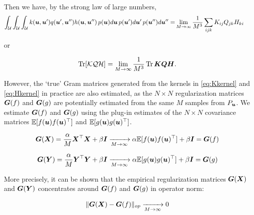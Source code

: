 %
%

Then we have, by the strong law of large numbers,
%
\begin{align*}
     \int_{\mathcal{U}} \int_{\mathcal{U}} \int_{\mathcal{U}} k(\boldsymbol{u}, \boldsymbol{u}') q(\boldsymbol{u}', \boldsymbol{u}'') h(\boldsymbol{u}, \boldsymbol{u}'')\, p(\boldsymbol{u}) d\boldsymbol{u} \,p(\boldsymbol{u}') d\boldsymbol{u}'\, p(\boldsymbol{u}'') d\boldsymbol{u}'' =& \lim_{M \rightarrow \infty} \frac{1}{M^3} \sum_{ijk} K_{ij} Q_{jk} H_{ki}
\end{align*}

or 

\begin{equation}\label{eq:strong-lln}
\operatorname*{Tr} [\mathcal{K}\mathcal{Q} \mathcal{H}]    = \lim_{M \rightarrow \infty}\frac{1}{M^3} \operatorname*{Tr} \boldsymbol{K} \boldsymbol{Q} \boldsymbol{H}.
\end{equation}


However, the `true' Gram matrices generated from the kernels in \cref{eq:Kkernel} and \cref{eq:Hkernel} in practice are also estimated, as the $N\times N$ regularization matrices $\boldsymbol{G}(f)$ and $\boldsymbol{G}(g)$ are potentially estimated from the same $M$ samples from $P_{\boldsymbol{u}}$. 
We estimate $\boldsymbol{G}(f)$ and $\boldsymbol{G}(g)$ using the plug-in estimates of the $N\times N$ covariance matrices $\mathbb{E}[f(\boldsymbol{u}) f(\boldsymbol{u})^\top]$ and $\mathbb{E}[g(\boldsymbol{u}) g(\boldsymbol{u})^\top]$.

\begin{align}
    \boldsymbol{G}(\boldsymbol{X}) = \frac{\alpha}{M} \boldsymbol{X}^\top \boldsymbol{X} + \beta \boldsymbol{I} \xrightarrow[M\rightarrow \infty]{}
 \alpha \mathbb{E}[f(\boldsymbol{u}) f(\boldsymbol{u})^\top] + \beta \boldsymbol{I} = \boldsymbol{G}(f)
\end{align}


\begin{align}
    \boldsymbol{G}(\boldsymbol{Y}) = \frac{\alpha}{M} \boldsymbol{Y}^\top \boldsymbol{Y} + \beta \boldsymbol{I} \xrightarrow[M\rightarrow \infty]{}
 \alpha \mathbb{E}[g(\boldsymbol{u}) g(\boldsymbol{u})^\top] + \beta \boldsymbol{I} = \boldsymbol{G}(g)
\end{align}

More precisely, it can be shown that the empirical regularization matrices $\boldsymbol{G}(\boldsymbol{X})$ and $\boldsymbol{G}(\boldsymbol{Y})$ concentrates around $\boldsymbol{G}(f)$ and $\boldsymbol{G}(g)$ in operator norm:

\begin{equation}
    \|  \boldsymbol{G}(\boldsymbol{X}) - \boldsymbol{G}(f)\|_{op} \xrightarrow[M\rightarrow \infty]{} 0
\end{equation}

